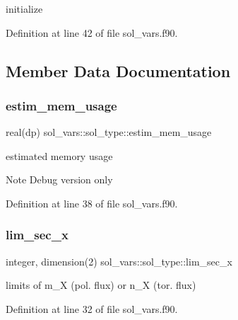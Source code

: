 initialize 



Definition at line 42 of file sol\+\_\+vars.\+f90.



\subsection{Member Data Documentation}
\mbox{\label{structsol__vars_1_1sol__type_a16f8e9b26e0d976589c79fe534982617}} 
\subsubsection{\texorpdfstring{estim\+\_\+mem\+\_\+usage}{estim\_mem\_usage}}
{\footnotesize\ttfamily real(dp) sol\+\_\+vars\+::sol\+\_\+type\+::estim\+\_\+mem\+\_\+usage}



estimated memory usage 

\begin{DoxyNote}{Note}
Debug version only 
\end{DoxyNote}


Definition at line 38 of file sol\+\_\+vars.\+f90.

\mbox{\label{structsol__vars_1_1sol__type_a2192f30619609d910a999dc6a8934934}} 
\subsubsection{\texorpdfstring{lim\+\_\+sec\+\_\+x}{lim\_sec\_x}}
{\footnotesize\ttfamily integer, dimension(2) sol\+\_\+vars\+::sol\+\_\+type\+::lim\+\_\+sec\+\_\+x}



limits of {\ttfamily m\+\_\+X} (pol. flux) or {\ttfamily n\+\_\+X} (tor. flux) 



Definition at line 32 of file sol\+\_\+vars.\+f90.

